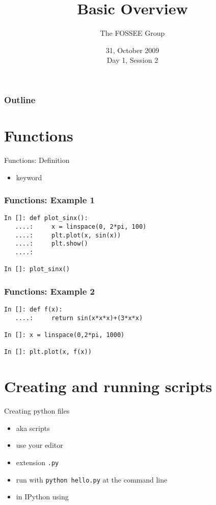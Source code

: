 \documentclass[14pt,compress]{beamer}
\title[Basic Python]{Basic Overview\\}
\author[FOSEE Team] {The FOSSEE Group}
\institute[IIT Bombay] {Department of Aerospace Engineering\\IIT Bombay}
\date[] {31, October 2009\\Day 1, Session 2}
\newcounter{time}
\newcommand{\inctime}[1]{\addtocounter{time}{#1}{\tiny \thetime\ m}}
\newcommand{\typ}[1]{\lstinline{#1}}
\newcommand{\kwrd}[1]{ \texttt{\textbf{\color{blue}{#1}}}  }
\begin{document}
\begin{frame}
  \titlepage
\end{frame}

\begin{frame}
  \frametitle{Outline}
  \tableofcontents
\end{frame}

\section{Functions}
\begin{frame}{Functions: Definition}
\begin{itemize}
  \item \kwrd{def} keyword
\end{itemize}
\end{frame}

\begin{frame}[fragile]
\frametitle{Functions: Example 1}
  \begin{lstlisting}
In []: def plot_sinx():
   ....:     x = linspace(0, 2*pi, 100)
   ....:     plt.plot(x, sin(x))
   ....:     plt.show()
   ....:    

In []: plot_sinx()
  \end{lstlisting}
\end{frame}

\begin{frame}[fragile]
\frametitle{Functions: Example 2}
  \begin{lstlisting}
In []: def f(x):
   ....:     return sin(x*x*x)+(3*x*x)

In []: x = linspace(0,2*pi, 1000)

In []: plt.plot(x, f(x))
  \end{lstlisting}
  \inctime{10}
\end{frame}


\section{Creating and running scripts}
\begin{frame}
  {Creating python files}
  \begin{itemize}
    \item aka scripts
    \item use your editor
    \item extension \typ{.py}
    \item run with \typ{python hello.py} at the command line
    \item in IPython using \kwrd{\%run}
  \end{itemize}
\inctime{5}
\end{frame}
\end{document}
